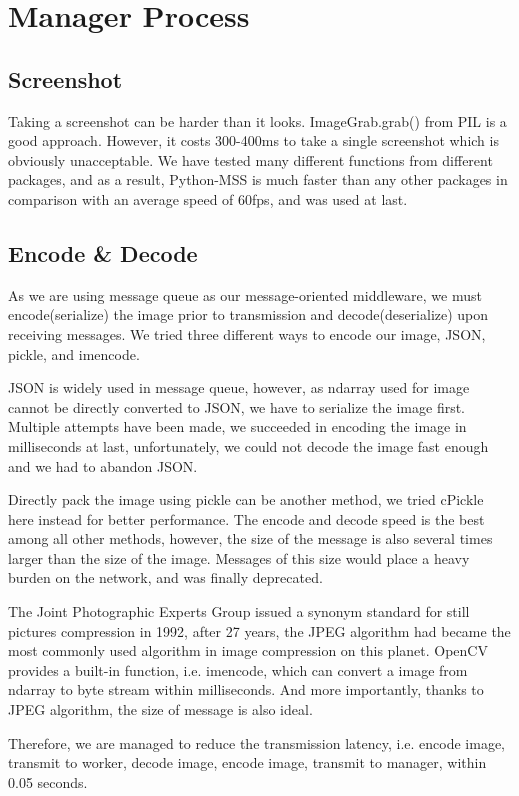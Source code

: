 \documentclass[runningheads]{llncs}
\begin{document}
\section{Manager Process}
\subsection{Screenshot}
Taking a screenshot can be harder than it looks. 
ImageGrab.grab() from PIL is a good approach. However, 
it costs 300-400ms to take a single screenshot which is 
obviously unacceptable. We have tested many different functions 
from different packages, and as a result, Python-MSS is much 
faster than any other packages in comparison with an 
average speed of 60fps, and was used at last.

\subsection{Encode \& Decode}
As we are using message queue as our message-oriented 
middleware, we must encode(serialize) the image prior to 
transmission and decode(deserialize) upon receiving messages. 
We tried three different ways to encode our image, JSON, 
pickle, and imencode. 

JSON is widely used in message queue, however, as ndarray 
used for image cannot be directly converted to JSON, we have 
to serialize the image first. Multiple attempts have been 
made, we succeeded in encoding the image in milliseconds at last, 
unfortunately, we could not decode the image fast enough 
and we had to abandon JSON. 

Directly pack the image using pickle can be another method, 
we tried cPickle here instead for better performance. The 
encode and decode speed is the best among all other methods, 
however, the size of the message is also several times 
larger than the size of the image. Messages of this size 
would place a heavy burden on the network, and was finally 
deprecated. 

The Joint Photographic Experts Group issued a synonym 
standard for still pictures compression in 1992, after 
27 years, the JPEG algorithm had became the most commonly 
used algorithm in image compression on this planet. OpenCV 
provides a built-in function, i.e. imencode, which can 
convert a image from ndarray to byte stream within 
milliseconds. And more importantly, thanks to JPEG 
algorithm, the size of message is also ideal. 

Therefore, we are managed to reduce the transmission 
latency, i.e. encode image, transmit to worker, decode 
image, encode image, transmit to manager, within 0.05 seconds.
\end{document}

